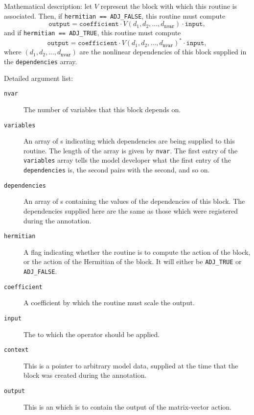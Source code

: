 \begin{framed}
Mathematical description: let $V$ represent the block with which this routine is associated. Then,
if \texttt{hermitian == ADJ_FALSE}, this routine must compute
\begin{equation*}
\texttt{output} = \texttt{coefficient} \cdot V(d_1,d_2,\dots,d_{\texttt{nvar}}) \cdot \texttt{input},
\end{equation*}
and if \texttt{hermitian == ADJ_TRUE}, this routine must compute
\begin{equation*}
\texttt{output} = \texttt{coefficient} \cdot V(d_1,d_2,\dots,d_{\texttt{nvar}})^* \cdot \texttt{input},
\end{equation*}
where $(d_1, d_2, \dots, d_{\texttt{nvar}})$ are the nonlinear dependencies of this block supplied in the \texttt{dependencies} array.
\end{framed}

\begin{framed}
Detailed argument list:
\begin{description}
\item[\texttt{nvar}] The number of variables that this block depends on.
\item[\texttt{variables}] An array of s indicating which dependencies are being supplied to this routine. The length of the
array is given by \texttt{nvar}. The first entry of the \texttt{variables} array
tells the model developer what the first entry of the \texttt{dependencies} is, the second pairs with the second, and so on.
\item[\texttt{dependencies}] An array of s containing the values of the dependencies of this block. The dependencies supplied
here are the same as those which were registered during the annotation.
\item[\texttt{hermitian}] A flag indicating whether the routine is to compute the action of the block, or the action of the Hermitian of the
block. It will either be \texttt{ADJ_TRUE} or \texttt{ADJ_FALSE}.
\item[\texttt{coefficient}] A coefficient by which the routine must scale the output.
\item[\texttt{input}] The  to which the operator should be applied.
\item[\texttt{context}] This is a pointer to arbitrary model data, supplied at the time that the block was created during the annotation.
\item[\texttt{output}] This is an  which is to contain the output of the matrix-vector action.
\end{description}
\end{framed}


